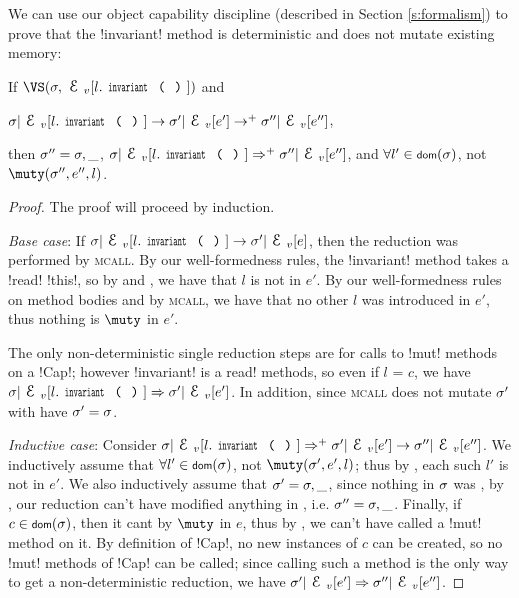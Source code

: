 We can use our object capability discipline (described in Section \ref{s:formalism}) to prove that the \Q!invariant! method is deterministic and does not mutate existing memory:%
\SS\begin{Lemma}[Determinism]\rm If $\VS(\s, \EV[l.\invariant])$ and
\begin{iitemize}
\item $\s|\EV[l.\invariant] \rightarrow \s'|\EV[e'] \rightarrow^{+} \s''|\EV[e'']$,
\end{iitemize}

\indent then $\sigma'' = \sigma,\_$, $\s|\EV[l.\invariant] \Rightarrow^+ \s''|\EV[e'']$, and $\forall l' \in \dom(\s)$, not $\muty(\s'', e'', l)$.
\end{Lemma}\SS
\begin{proof}
The proof will proceed by induction.

\emph{Base case}: If $\s|\EV[l.\invariant] \rightarrow \s'|\EV[e]$, then the reduction was performed by \textsc{mcall}.
By our well-formedness rules, the \Q!invariant! method takes a \Q!read! \Q!this!, so by  and , we have that $l$ is not \muty in $e'$. By our well-formedness rules on method bodies and by \textsc{mcall}, we have that no other $l$ was introduced in $e'$, thus nothing is $\muty$ in $e'$.

The only non-deterministic single reduction steps are for calls to \Q!mut! methods on a \Q!Cap!; however \Q!invariant! is a \!read! methods, so even if $l$ = $c$, we have $\s|\EV[l.\invariant] \Rightarrow \s'|\EV[e']$. In addition, since \textsc{mcall} does not mutate $\sigma'$ with have $\sigma' = \sigma$.

\emph{Inductive case}: Consider $\s|\EV[l.\invariant] \Rightarrow^+ \s'|\EV[e'] \rightarrow \s''|\EV[e'']$. We inductively assume that $\forall l' \in \dom(\s)$, not $\muty(\s', e', l)$; thus by , each such $l'$ is not \muty in $e'$. We also inductively assume that $\sigma' = \sigma,\_$, since nothing in $\sigma$ was \muty, by , our reduction can't have modified anything in \s, i.e. $\sigma'' = \sigma,\_$. Finally, if $c \in \dom(\s)$, then it cant by $\muty$ in $e$, thus by , we can't have called a \Q!mut! method on it. By definition of \Q!Cap!, no new instances of $c$ can be created, so no \Q!mut! methods of \Q!Cap! can be called; since calling such a method is the only way to get a non-deterministic reduction, we have $\s'|\EV[e'] \Rightarrow \s''|\EV[e'']$.
\end{proof}

